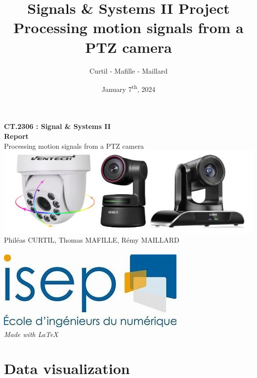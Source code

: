 \documentclass[a4paper,12pt]{article}
\title{Signals \& Systems II  Project\\[1ex]\large Processing motion signals from a PTZ camera}
\author{Curtil - Mafille - Maillard}
\date{January 7\textsuperscript{th}, 2024}
\begin{document}
\begin{titlepage}
    \centering
    \vspace{3cm}
    \Huge{\color{blue}\textbf{CT.2306 : Signal  \& Systems II }}\\
    \vspace{1cm}
    \Huge{\textbf{Report}}\\
    \vspace{0.5cm}
    \Large{Processing motion signals from a PTZ camera} \\
    \vspace{1cm}
    \includegraphics[scale=1]{Images/camera.jpg}\\
    \vspace{1.5cm}
    Philéas CURTIL, Thomas MAFILLE, Rémy MAILLARD \\
    \vspace{0.5cm}
    \vspace{1.5cm}
    \thedate \\
    \vspace{2cm}
    \includegraphics[scale=0.7]{Images/Isep.jpg}\\
    \vspace{2cm}
    \small{\textit{Made with LaTeX}}

\end{titlepage}

\tableofcontents
\setlength{\parskip}{10pt}

\newpage

\section{Data visualization}
\end{document}

